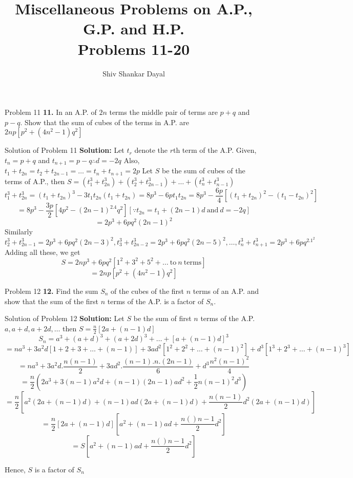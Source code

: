 \documentclass[aspectratio=1610,8pt]{beamer}
\title{Miscellaneous Problems on A.P., G.P. and H.P.\\Problems 11-20}
\author[Shiv Shankar Dayal]{Shiv Shankar Dayal}
\begin{document}
\begin{frame}
  \titlepage
\end{frame}
\begin{frame}{Problem 11}
  \textbf{11.} In an A.P. of $2n$ terms the middle pair of terms are $p + q$ and $p - q.$ Show that the sum of cubes of the terms
  in A.P. are $2np[p^2 + (4n^2 - 1)q^2]$
\end{frame}
\begin{frame}{Solution of Problem 11}
  \textbf{Solution:} Let $t_r$ denote the $r$th term of the A.P.
  \linebreak\linebreak
  Given, $t_n = p + q$ and $t_{n + 1} = p - q \therefore d = -2q$
  \linebreak\linebreak
  Also, $t_1 + t_{2n} = t_2 + t_{2n - 1} = \ldots = t_n + t_{n + 1} = 2p$
  \linebreak\linebreak
  Let $S$ be the sum of cubes of the terms of A.P., then $S = (t_1^3 + t_{2n}^3) + (t_2^3 + t_{2n - 1}^3) + \ldots + (t_n^3 + t_{n
    - 1}^3)$
  $$t_1^3 + t_{2n}^3 = (t_1 + t_{2n})^3 - 3t_1t_{2n}(t_1 + t_{2n}) = 8p^3 - 6pt_1t_{2n} = 8p^3 - \frac{6p}{4}[(t_1 + t_{2n})^2 -
    (t_1 - t_{2n})^2]$$
  $$= 8p^3 - \frac{3p}{2}[4p^2 - (2n - 1)^2.4q^2][\because t_{2n} = t_1 + (2n - 1)d~\text{and}~d = -2q]$$
  $$= 2p^3 + 6pq^2(2n - 1)^2$$
  Similarly $$t_2^3 + t_{2n - 1}^3 = 2p^3 + 6pq^2(2n - 3)^2, t_3^3 + t_{2n - 2}^3 = 2p^3 + 6pq^2(2n - 5)^2, \ldots, t_n^3 + t_{n +
    1}^3 = 2p^3 + 6pq^2.1^2$$
  Adding all these, we get
  $$S = 2np^3 + 6pq^2[1^2 + 3^2 + 5^2 + \ldots~\text{to}~n~\text{terms}]$$
  $$= 2np[p^2 + (4n^2 - 1)q^2]$$
\end{frame}
\begin{frame}{Problem 12}
  \textbf{12.} Find the sum $S_n$ of the cubes of the first $n$ terms of an A.P. and show that the sum of the first $n$ terms of
  the A.P. is a factor of $S_n.$
\end{frame}
\begin{frame}{Solution of Problem 12}
  \textbf{Solution:} Let $S$ be the sum of first $n$ terms of the A.P. $a, a + d, a + 2d, \ldots$ then $S = \frac{n}{2}[2a + (n -
    1)d]$
  $$S_n = a^3 + (a + d)^3 + (a + 2d)^3 + \ldots + [a + (n - 1)d]^3$$
  $$= na^3 + 3a^2d[1 + 2 + 3 + \ldots + (n - 1)] + 3ad^2[1^2 + 2^2 + \ldots + (n - 1)^2] + d^3[1^3 + 2^3 + \ldots + (n - 1)^3]$$
  $$= na^3 + 3a^2d.\frac{n(n - 1)}{2} + 3ad^2.\frac{(n - 1).n.(2n - 1)}{6} + d^3\frac{n^2(n - 1)^2}{4}$$
  $$= \frac{n}{2}\left(2a^3 + 3(n - 1)a^2d + (n - 1)(2n - 1)ad^2 + \frac{1}{2}n(n - 1)^2d^3\right)$$
  $$= \frac{n}{2}\left[a^2(2a + (n - 1)d) + (n - 1)ad(2a + (n - 1)d) + \frac{n(n - 1)}{2}d^2(2a + (n - 1)d)\right]$$
  $$= \frac{n}{2}[2a + (n - 1)d]\left[a^2 + (n - 1)ad + \frac{n()n - 1}{2}d^2\right]$$
  $$= S\left[a^2 + (n - 1)ad + \frac{n()n - 1}{2}d^2\right]$$

  Hence, $S$ is a factor of $S_n$
\end{frame}
\end{document}
